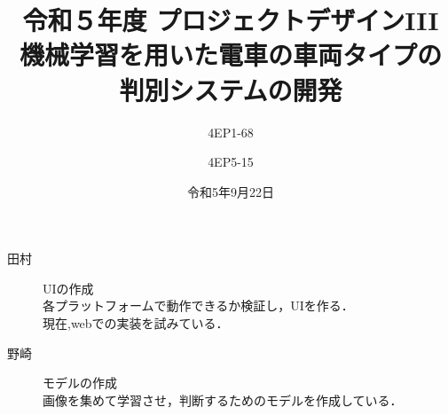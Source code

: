 % 
%

\title{
{\normalsize 令和５年度 プロジェクトデザインIII}\\\vspace{10mm}
{\LARGE 機械学習を用いた電車の車両タイプの\\判別システムの開発}
}
\date{令和5年9月22日}
\author{
4EP1-68\\  \and
4EP5-15\\  
}



\usepackage{subcaption}
\usepackage{comment}



\maketitle %
\addtocounter{page}{1}
\thispagestyle{myfirstpage}

\begin{description}
	\item [田村] UIの作成~\\
	各プラットフォームで動作できるか検証し，UIを作る．\\
	現在,webでの実装を試みている．
	
	\item [野崎] モデルの作成~\\
	画像を集めて学習させ，判断するためのモデルを作成している．
	
\end{description}



